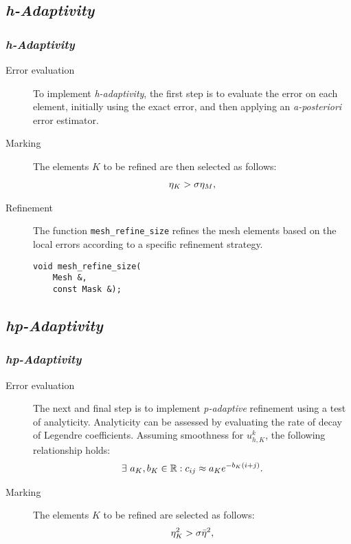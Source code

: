 \subsection{\textit{h-Adaptivity}}

\begin{frame}[fragile]
    \frametitle{\textit{h-Adaptivity}}

    \begin{description}
        \item[Error evaluation] To implement \textit{h-adaptivity}, the first step is to evaluate the error on each element, initially using the exact error, and then applying an \textit{a-posteriori} error estimator.
        \item[Marking] The elements $K$ to be refined are then selected as follows:
            \begin{gather}
                \eta_K > \sigma \eta_{M}, \notag
            \end{gather}
        \item[Refinement] The function \lstinline{mesh_refine_size} refines the mesh elements based on the local errors according to a specific refinement strategy.
\begin{lstlisting}[style=cpp]
void mesh_refine_size(
    Mesh &, 
    const Mask &);
\end{lstlisting}
    \end{description}

\end{frame}

\subsection{\textit{hp-Adaptivity}}

\begin{frame}[fragile]
    \frametitle{\textit{hp-Adaptivity}}

    \begin{description}
        \item[Error evaluation] The next and final step is to implement \textit{p-adaptive} refinement using a test of analyticity. Analyticity can be assessed by evaluating the rate of decay of Legendre coefficients. Assuming smoothness for $u^k_{h, K}$, the following relationship holds:
        \begin{gather}
            \exists ~ a_K, b_K \in \mathbb{R} : c_{ij} \approx a_K e^{-b_K (i + j)}.
        \end{gather}
        \item[Marking] The elements $K$ to be refined are selected as follows:
        \begin{gather}
            \eta_K^2 > \sigma \bar{\eta}^2, \notag
        \end{gather}
    \end{description}

\end{frame}

